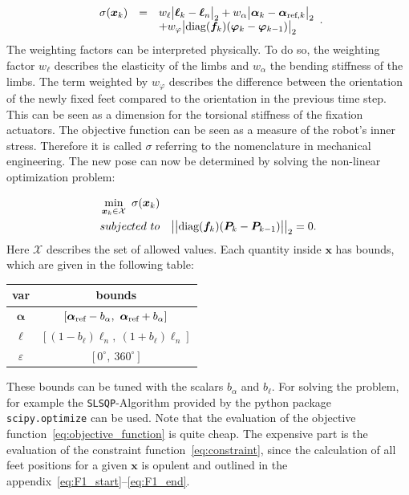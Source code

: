 \documentclass[letterpaper,10pt,conference]{ieeeconf}  %
\begin{document}
\begin{equation}
\begin{array}{ccl}
\sigma(\bm{x}_{k}) &=& 
w_\ell\big| \bm{\ell}_{k} - \bm{\ell}_n \big|_2
+ w_\alpha\big| \bm{\alpha}_{k} - \bm{\alpha}_{\textnormal{ref},k} \big|_2 \\
&&+ w_\varphi \big| \textnormal{diag}(\bm{f}_k) ( \bm{\varphi}_{k} - \bm{\varphi}_{k-1}) \big|_2
\end{array}.
\label{eq:objective_function}
\end{equation}
The weighting factors can be interpreted physically.
To do so, the weighting factor $w_\ell$ describes the elasticity of the limbs and $w_\alpha$ the bending stiffness of the limbs.
The term weighted by $w_\varphi$ describes the difference between the orientation of the newly fixed feet compared to the orientation in the previous time step.
This can be seen as a dimension for the torsional stiffness of the fixation actuators.
The objective function can be seen as a measure of the robot's inner stress.
Therefore it is called $\sigma$ referring to the nomenclature in mechanical engineering.
The new pose can now be determined by solving the non-linear optimization problem:

\begin{equation}
\begin{split}
&\min_{\bm{x}_k \in \mathcal{X}} ~ \sigma(\bm{x}_k) \\
&subjected~to~~~
\big|\big|\textnormal{diag}(\bm{f}_k)(\bm{P}_{k} - \bm{P}_{k-1})\big|\big|_2 = 0.
\end{split}
\end{equation}
Here  $\mathcal{X}$ describes the set of allowed values.
Each quantity inside $\bm{x}$ has bounds, which are given in the following table:

\begin{center}
\begin{tabular}{c|c}
var & bounds \\
\hline
$\bm{\alpha}$ & $\left[ \bm{\alpha_{\textnormal{ref}}}-b_\alpha,~\bm{\alpha_{\textnormal{ref}}}+b_\alpha \right]$ \\
$\bm{\ell}$ & $\left[ (1-b_\ell)\bm{\ell}_n,~(1+b_\ell)\bm{\ell}_n \right]$ \\
$\varepsilon$ & $\left[ 0^\circ,~ 360^\circ \right]$ \\
\end{tabular}
\end{center}
These bounds can be tuned with the scalars $b_\alpha$ and $b_\ell$.
For solving the problem, for example the \texttt{SLSQP}-Algorithm provided by the python package \texttt{scipy.optimize} can be used.
Note that the evaluation of the objective function~\eqref{eq:objective_function} is quite cheap. 
The expensive part is the evaluation of the constraint function~\eqref{eq:constraint}, since the calculation of all feet positions for a given $\bm{x}$ is opulent and outlined in the appendix~\eqref{eq:F1_start}--\eqref{eq:F1_end}.
\end{document}
